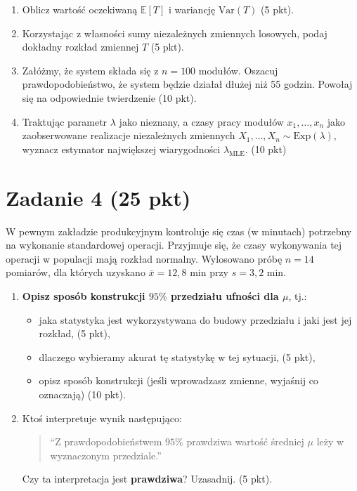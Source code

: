 \documentclass[polish, 10pt]{extarticle}
\begin{document}
\begin{enumerate}
    \item[a)] Oblicz wartość oczekiwaną $\mathbb{E}[T]$ i wariancję $\text{Var}(T)$ \hfill (5 pkt).
    \item[b)] Korzystając z własności sumy niezależnych zmiennych losowych, podaj dokładny rozkład zmiennej $T$ \hfill (5 pkt).
    \item[c)] Załóżmy, że system składa się z $n=100$ modułów. Oszacuj prawdopodobieństwo, że system będzie działał dłużej niż 55 godzin. Powołaj się na odpowiednie twierdzenie \hfill (10 pkt).
    \item[d)] Traktując parametr $\lambda$ jako nieznany, a czasy pracy modułów $x_1,\dots,x_n$ jako zaobserwowane realizacje niezależnych zmiennych $X_1,\dots,X_n \sim \mathrm{Exp}(\lambda)$, wyznacz estymator największej wiarygodności $\hat\lambda_{\text{MLE}}$. \hfill (10 pkt)
\end{enumerate}

\section*{Zadanie 4 (25 pkt)}
W pewnym zakładzie produkcyjnym kontroluje się czas (w minutach) potrzebny na wykonanie standardowej operacji. Przyjmuje się, że czasy wykonywania tej operacji w populacji mają rozkład normalny. Wylosowano próbę \textbf{$n = 14$} pomiarów, dla których uzyskano $\bar{x} = 12{,}8$ min przy $s = 3{,}2$ min.

\begin{enumerate}
    \item \textbf{Opisz sposób konstrukcji $95\%$ przedziału ufności dla $\mu$}, tj.:
    \begin{itemize}
        \item jaka statystyka jest wykorzystywana do budowy przedziału i jaki jest jej rozkład, \hfill (5 pkt),
        \item dlaczego wybieramy akurat tę statystykę w tej sytuacji, \hfill (5 pkt),
        \item opisz sposób konstrukcji (jeśli wprowadzasz zmienne, wyjaśnij  co oznaczają) \hfill (10 pkt).
    \end{itemize}

    \item Ktoś interpretuje wynik następująco:
    \begin{quote}
    ``Z prawdopodobieństwem $95\%$ prawdziwa wartość średniej $\mu$ leży w wyznaczonym przedziale.''
    \end{quote}
    Czy ta interpretacja jest \textbf{prawdziwa}? Uzasadnij. \hfill (5 pkt).
\end{enumerate}
\end{document}
